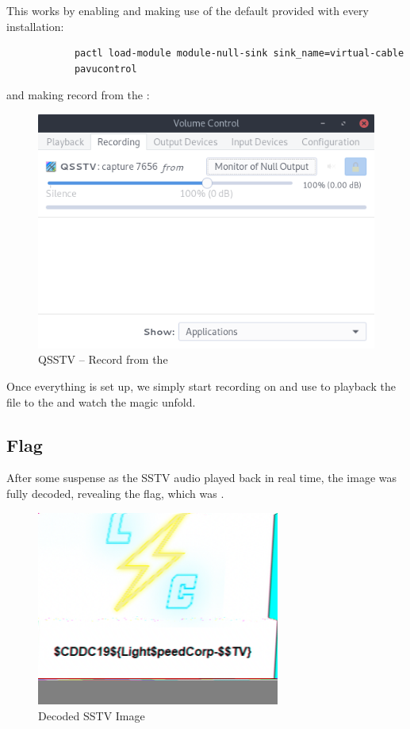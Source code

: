 		This works by enabling and making use of the default  provided with every  installation:
		
		\begin{verbatim}
			pactl load-module module-null-sink sink_name=virtual-cable
			pavucontrol
		\end{verbatim}
	
		and making  record from the :
		
		\begin{figure}[!htbp]
			\centering
			\includegraphics[width=150mm]{figures/sstv/pavu.png} \vspace{5mm}
			\caption{QSSTV -- Record from the }
		\end{figure}
		
		Once everything is set up, we simply start recording on  and use  to playback the  file to the  and watch the magic unfold.

	\subsection{Flag}
		After some suspense as the SSTV audio played back in real time, the image was fully decoded, revealing the flag, which
		was .

		\begin{figure}[!htbp]\centering
			\includegraphics[width=80mm]{figures/sstv/SSTV.png} \vspace{5mm}
			\caption{Decoded SSTV Image}
		\end{figure}
